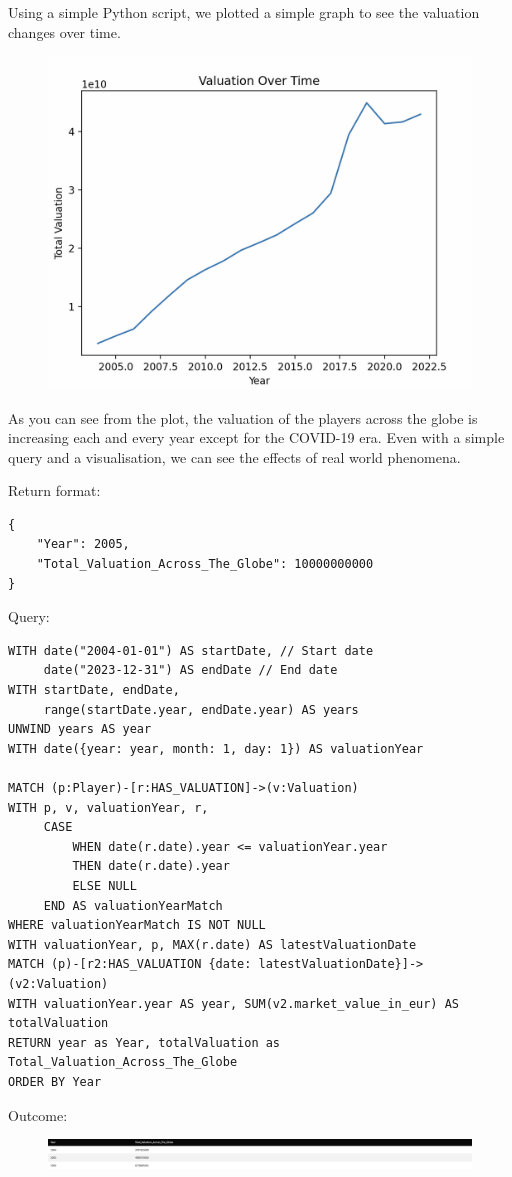\documentclass{Configuration_Files/PoliMi3i_thesis}
\begin{document}
Using a simple Python script, we plotted a simple graph to see the valuation changes over time. 

\begin{figure}[H]
    \centering
    \includegraphics[width=0.5\linewidth]{valuationovertime.png}
\end{figure}

As you can see from the plot, the valuation of the players across the globe is increasing each and every year except for the COVID-19 era. Even with a simple query and a visualisation, we can see the effects of real world phenomena.


Return format:
\begin{lstlisting}[style=json]
{
    "Year": 2005,
    "Total_Valuation_Across_The_Globe": 10000000000
}
\end{lstlisting}


Query:

\begin{lstlisting}[language=Cypher]
WITH date("2004-01-01") AS startDate, // Start date
     date("2023-12-31") AS endDate // End date
WITH startDate, endDate,
     range(startDate.year, endDate.year) AS years
UNWIND years AS year
WITH date({year: year, month: 1, day: 1}) AS valuationYear

MATCH (p:Player)-[r:HAS_VALUATION]->(v:Valuation)
WITH p, v, valuationYear, r, 
     CASE 
         WHEN date(r.date).year <= valuationYear.year 
         THEN date(r.date).year 
         ELSE NULL 
     END AS valuationYearMatch
WHERE valuationYearMatch IS NOT NULL
WITH valuationYear, p, MAX(r.date) AS latestValuationDate
MATCH (p)-[r2:HAS_VALUATION {date: latestValuationDate}]->(v2:Valuation)
WITH valuationYear.year AS year, SUM(v2.market_value_in_eur) AS totalValuation
RETURN year as Year, totalValuation as Total_Valuation_Across_The_Globe
ORDER BY Year
\end{lstlisting}


Outcome:
\begin{figure}[H]
    \centering
    \includegraphics[width=\linewidth]{Project Template/Images/query_output/q19.png}
\end{figure}
\end{document}
